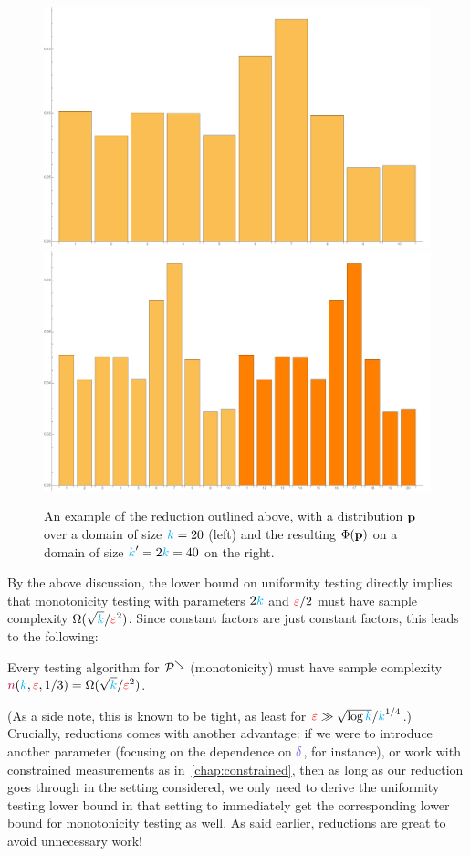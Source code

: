 \begin{figure}[htbp]\centering
\includegraphics[width=.45\textwidth]{figures/fig-reduction-uniformity}\hfill
\includegraphics[width=.45\textwidth]{figures/fig-reduction-uniformity2}
\caption{An example of the reduction outlined above, with a distribution $\mathbf{p}$ over a domain of size ${\textcolor{cyan}{k}}=20$ (left) and the resulting $\Phi(\mathbf{p})$ on a domain of size ${\textcolor{cyan}{k}}'=2{\textcolor{cyan}{k}}=40$ on the right.\label{fig:reduction:monotonicity:example}}
\end{figure}
By the above discussion, the lower bound on uniformity testing directly implies that monotonicity testing with parameters $2{\textcolor{cyan}{k}}$ and $\textcolor{red}{\varepsilon}/2$ must have sample complexity $\Omega(\sqrt{{\textcolor{cyan}{k}}}/\textcolor{red}{\varepsilon}^2)$. Since constant factors are just constant factors, this leads to the following:
\begin{theorem}
	\label{theo:lb:testing:monotonicity}
Every testing algorithm for $\mathcal{P}^{\searrow}$ (monotonicity) must have sample complexity ${\textcolor{purple}{n}}({\textcolor{cyan}{k}},\textcolor{red}{\varepsilon},1/3) = \Omega(\sqrt{{\textcolor{cyan}{k}}}/\textcolor{red}{\varepsilon}^2)$.
\end{theorem}
\noindent(As a side note, this is known to be tight, as least for $\textcolor{red}{\varepsilon} \gg \sqrt{\log{\textcolor{cyan}{k}}}/{\textcolor{cyan}{k}}^{1/4}$.) Crucially, reductions comes with another advantage: if we were to introduce another parameter (focusing on the dependence on $\errprob$, for instance), or work with constrained measurements as in~\cref{chap:constrained}, then as long as our reduction goes through in the setting considered, we only need to derive the uniformity testing lower bound in that setting to immediately get the corresponding lower bound for monotonicity testing as well. As said earlier, reductions are great to avoid unnecessary work!

